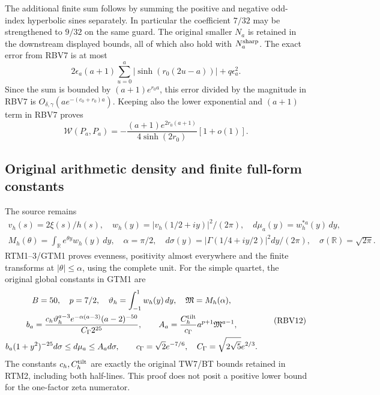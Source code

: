 \documentclass[11pt,a4paper]{article}
\begin{document}
The additional finite sum follows by summing the positive and
negative odd-index hyperbolic sines separately. In particular the
coefficient $7/32$ may be strengthened to $9/32$ on the same guard.
The original smaller $N_a$ is retained in the downstream displayed
bounds, all of which also hold with $N_a^{\rm sharp}$.
The exact error from RBV7 is at most
\[
2\epsilon_a(a+1)\sum_{u=0}^a|\sinh(r_0(2u-a))|
                         +q\epsilon_a^2.\tag{RBV9}
\]
Since the sum is bounded by $(a+1)e^{r_0a}$, this error divided by
the magnitude in RBV7 is
$O_{\delta,\gamma}(a e^{-(c_0+r_0)a})$.
Keeping also the lower exponential and $(a+1)$ term in RBV7 proves
\[
\mathcal W(P_a,P_a)
=-\frac{(a+1)e^{2r_0(a+1)}}{4\sinh(2r_0)}[1+o(1)].
\tag{RBV10}
\]

\subsection{Original arithmetic density and finite full-form constants}
The source remains
\[
\begin{gathered}
v_h(s)=2\xi(s)/h(s),\quad
w_h(y)=|v_h(1/2+iy)|^2/(2\pi),\quad
d\mu_a(y)=w_h^{*a}(y)\,dy,\\
M_h(\theta)=\int_{\mathbb R}e^{\theta y}w_h(y)\,dy,
\quad\alpha=\pi/2,\quad
d\sigma(y)=|\Gamma(1/4+iy/2)|^2dy/(2\pi),\quad
\sigma(\mathbb R)=\sqrt{2\pi}.
\end{gathered}\tag{RBV11}
\]
RTM1--3/GTM1 proves evenness, positivity almost everywhere and the
finite transforms at $|\theta|\le\alpha$, using the complete unit.
For the simple quartet, the original global constants in GTM1 are
\[
\begin{gathered}
B=50,\quad p=7/2,\quad
\vartheta_h=\int_{-1}^1w_h(y)\,dy,\quad\mathfrak M=M_h(\alpha),\\
b_a=\frac{c_h\vartheta_h^{a-3}e^{-\alpha(a-3)}(a-2)^{-50}}
 {C_\Gamma2^{25}},\qquad
A_a=\frac{C_h^{\rm tilt}}{c_\Gamma}a^{p+1}\mathfrak M^{a-1},\\
b_a(1+y^2)^{-25}d\sigma\le d\mu_a\le A_a d\sigma,\qquad
c_\Gamma=\sqrt2e^{-7/6},\quad C_\Gamma=\sqrt{2\sqrt5}e^{2/3}.
\end{gathered}\tag{RBV12}
\]
The constants $c_h,C_h^{\rm tilt}$ are exactly the original
TW7/BT bounds retained in RTM2, including both half-lines. This proof
does not posit a positive lower bound for the one-factor zeta numerator.
\end{document}
